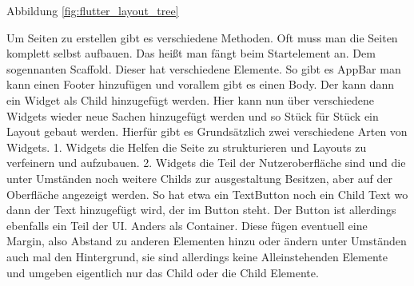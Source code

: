 Abbildung \ref{fig:flutter_layout_tree}

Um Seiten zu erstellen gibt es verschiedene Methoden. Oft muss man die Seiten komplett selbst aufbauen. Das heißt man fängt beim Startelement an. Dem sogennanten Scaffold. Dieser hat verschiedene Elemente. So gibt es AppBar man kann einen Footer hinzufügen und vorallem gibt es einen Body. Der kann dann ein Widget als Child hinzugefügt werden. Hier kann nun über verschiedene Widgets wieder neue Sachen hinzugefügt werden und so Stück für Stück ein Layout gebaut werden. 
Hierfür gibt es Grundsätzlich zwei verschiedene Arten von Widgets. 
1. Widgets die Helfen die Seite zu strukturieren und Layouts zu verfeinern und aufzubauen.
2. Widgets die Teil der Nutzeroberfläche sind und die unter Umständen noch weitere Childs zur ausgestaltung Besitzen, aber auf der Oberfläche angezeigt werden. So hat etwa ein TextButton noch ein Child Text wo dann der Text hinzugefügt wird, der im Button steht. Der Button ist allerdings ebenfalls ein Teil der UI. Anders als Container. Diese fügen eventuell eine Margin, also Abstand zu anderen Elementen hinzu oder ändern unter Umständen auch mal den Hintergrund, sie sind allerdings keine Alleinstehenden Elemente und umgeben eigentlich nur das Child oder die Child Elemente.




